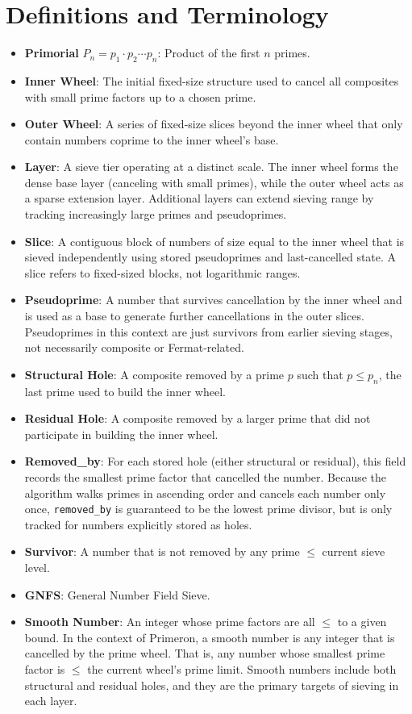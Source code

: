 
\newpage
\section{Definitions and Terminology}
\begin{itemize}
  \item \textbf{Primorial} \( P_n = p_1 \cdot p_2 \cdots p_n \): Product of the first \( n \) primes.
  \item \textbf{Inner Wheel}: The initial fixed-size structure used to cancel all composites with small prime factors up to a chosen prime.
  \item \textbf{Outer Wheel}: A series of fixed-size slices beyond the inner wheel that only contain numbers coprime to the inner wheel's base.
  \item \textbf{Layer}: A sieve tier operating at a distinct scale. The inner wheel forms the dense base layer (canceling with small primes), while the outer wheel acts as a sparse extension layer. Additional layers can extend sieving range by tracking increasingly large primes and pseudoprimes.
  \item \textbf{Slice}: A contiguous block of numbers of size equal to the inner wheel that is sieved independently using stored pseudoprimes and last-cancelled state. A slice refers to fixed-sized blocks, not logarithmic ranges.
  \item \textbf{Pseudoprime}: A number that survives cancellation by the inner wheel and is used as a base to generate further cancellations in the outer slices. Pseudoprimes in this context are just survivors from earlier sieving stages, not necessarily composite or Fermat-related.
  \item \textbf{Structural Hole}: A composite removed by a prime \( p \) such that \( p \leq p_n \), the last prime used to build the inner wheel.
  \item \textbf{Residual Hole}: A composite removed by a larger prime that did not participate in building the inner wheel.
  \item \textbf{Removed\_by}: For each stored hole (either structural or residual), this field records the smallest prime factor that cancelled the number. Because the algorithm walks primes in ascending order and cancels each number only once, \texttt{removed\_by} is guaranteed to be the lowest prime divisor, but is only tracked for numbers explicitly stored as holes.
  \item \textbf{Survivor}: A number that is not removed by any prime \( \leq \) current sieve level.
  \item \textbf{GNFS}: General Number Field Sieve.
  \item \textbf{Smooth Number}: An integer whose prime factors are all \( \leq \) to a given bound. In the context of Primeron, a smooth number is any integer that is cancelled by the prime wheel.  That is, any number whose smallest prime factor is \( \leq \) the current wheel’s prime limit. Smooth numbers include both structural and residual holes, and they are the primary targets of sieving in each layer.
\end{itemize}

